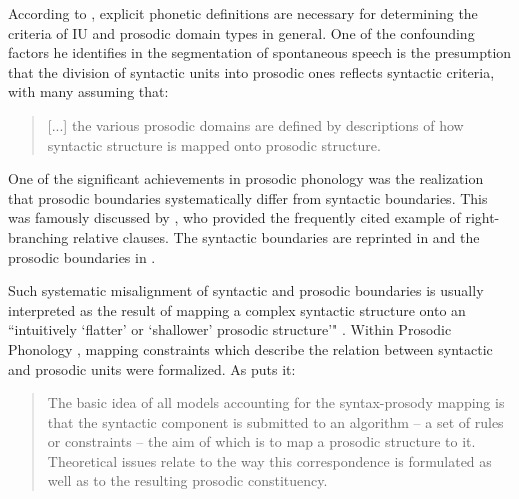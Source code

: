 According to \citet[288]{Ladd_2008}, explicit phonetic definitions are necessary for determining the criteria of IU and prosodic domain types in general. One of the confounding factors he identifies in the segmentation of spontaneous speech is the presumption that the division of syntactic units into prosodic ones reflects syntactic criteria, with many assuming that:
\begin{quote}
	[...] the various prosodic domains are defined by descriptions of how syntactic structure is mapped onto prosodic structure. \citep[289]{Ladd_2008}
\end{quote}


One of the significant achievements in prosodic phonology was the realization that prosodic boundaries systematically differ from syntactic boundaries. This was famously discussed by \citet{chomsky1968sound}, who provided the frequently cited example of right-branching relative clauses. The syntactic boundaries are reprinted in  and the prosodic boundaries in .


\ea
\label{ex:this is the dog}


\z
\z


Such systematic misalignment of syntactic and prosodic boundaries is usually interpreted as the result of mapping a complex syntactic structure onto an ``intuitively `flatter' or `shallower' prosodic structure'" \citep[290]{Ladd_2008}.
Within Prosodic Phonology \citep{nespor1983prosodic, selkirk1986, marina1986prosodic}, mapping constraints which describe the relation between syntactic and prosodic units were formalized. As \citet[62--63]{Fery_2016} puts it: 

\begin{quote}
	The basic idea of all models accounting for the syntax-prosody mapping is that the syntactic component is submitted to an algorithm -- a set of rules or constraints -- the aim of which is to map a prosodic structure to it. Theoretical issues relate to the way this correspondence is formulated as well as to the resulting prosodic constituency.  
\end{quote}


